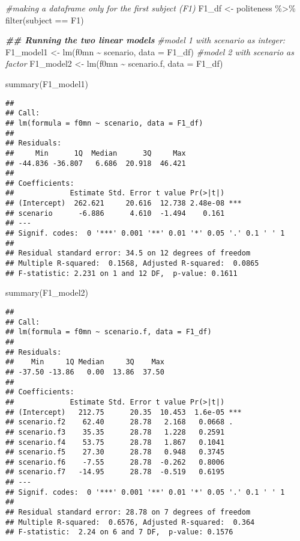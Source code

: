 \documentclass[
]{article}
\newenvironment{Shaded}{\begin{snugshade}}{\end{snugshade}}
\newcommand{\AttributeTok}[1]{\textcolor[rgb]{0.77,0.63,0.00}{#1}}
\newcommand{\CommentTok}[1]{\textcolor[rgb]{0.56,0.35,0.01}{\textit{#1}}}
\newcommand{\DocumentationTok}[1]{\textcolor[rgb]{0.56,0.35,0.01}{\textbf{\textit{#1}}}}
\newcommand{\FunctionTok}[1]{\textcolor[rgb]{0.00,0.00,0.00}{#1}}
\newcommand{\NormalTok}[1]{#1}
\newcommand{\OtherTok}[1]{\textcolor[rgb]{0.56,0.35,0.01}{#1}}
\newcommand{\SpecialCharTok}[1]{\textcolor[rgb]{0.00,0.00,0.00}{#1}}
\newcommand{\StringTok}[1]{\textcolor[rgb]{0.31,0.60,0.02}{#1}}
\begin{document}
\begin{Shaded}
\begin{Highlighting}[]
\CommentTok{\#making a dataframe only for the first subject (F1)}
\NormalTok{F1\_df }\OtherTok{\textless{}{-}}\NormalTok{ politeness }\SpecialCharTok{\%\textgreater{}\%}
  \FunctionTok{filter}\NormalTok{(subject }\SpecialCharTok{==} \StringTok{\textquotesingle{}F1\textquotesingle{}}\NormalTok{)}


\DocumentationTok{\#\# Running the two linear models}
\CommentTok{\#model 1 with scenario as integer:}
\NormalTok{F1\_model1 }\OtherTok{\textless{}{-}} \FunctionTok{lm}\NormalTok{(f0mn }\SpecialCharTok{\textasciitilde{}}\NormalTok{ scenario, }\AttributeTok{data =}\NormalTok{ F1\_df)}
\CommentTok{\#model 2 with scenario as factor}
\NormalTok{F1\_model2 }\OtherTok{\textless{}{-}} \FunctionTok{lm}\NormalTok{(f0mn }\SpecialCharTok{\textasciitilde{}}\NormalTok{ scenario.f, }\AttributeTok{data =}\NormalTok{ F1\_df)}

\FunctionTok{summary}\NormalTok{(F1\_model1)}
\end{Highlighting}
\end{Shaded}

\begin{verbatim}
## 
## Call:
## lm(formula = f0mn ~ scenario, data = F1_df)
## 
## Residuals:
##     Min      1Q  Median      3Q     Max 
## -44.836 -36.807   6.686  20.918  46.421 
## 
## Coefficients:
##             Estimate Std. Error t value Pr(>|t|)    
## (Intercept)  262.621     20.616  12.738 2.48e-08 ***
## scenario      -6.886      4.610  -1.494    0.161    
## ---
## Signif. codes:  0 '***' 0.001 '**' 0.01 '*' 0.05 '.' 0.1 ' ' 1
## 
## Residual standard error: 34.5 on 12 degrees of freedom
## Multiple R-squared:  0.1568, Adjusted R-squared:  0.0865 
## F-statistic: 2.231 on 1 and 12 DF,  p-value: 0.1611
\end{verbatim}

\begin{Shaded}
\begin{Highlighting}[]
\FunctionTok{summary}\NormalTok{(F1\_model2)}
\end{Highlighting}
\end{Shaded}

\begin{verbatim}
## 
## Call:
## lm(formula = f0mn ~ scenario.f, data = F1_df)
## 
## Residuals:
##    Min     1Q Median     3Q    Max 
## -37.50 -13.86   0.00  13.86  37.50 
## 
## Coefficients:
##             Estimate Std. Error t value Pr(>|t|)    
## (Intercept)   212.75      20.35  10.453  1.6e-05 ***
## scenario.f2    62.40      28.78   2.168   0.0668 .  
## scenario.f3    35.35      28.78   1.228   0.2591    
## scenario.f4    53.75      28.78   1.867   0.1041    
## scenario.f5    27.30      28.78   0.948   0.3745    
## scenario.f6    -7.55      28.78  -0.262   0.8006    
## scenario.f7   -14.95      28.78  -0.519   0.6195    
## ---
## Signif. codes:  0 '***' 0.001 '**' 0.01 '*' 0.05 '.' 0.1 ' ' 1
## 
## Residual standard error: 28.78 on 7 degrees of freedom
## Multiple R-squared:  0.6576, Adjusted R-squared:  0.364 
## F-statistic:  2.24 on 6 and 7 DF,  p-value: 0.1576
\end{verbatim}
\end{document}
